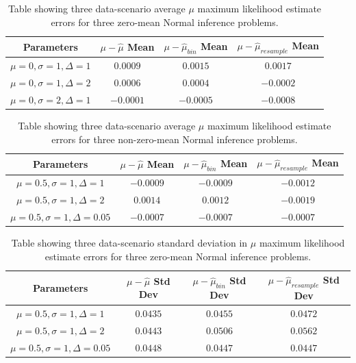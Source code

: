 \documentclass[11pt,a4,twosided,singlespacing,titlepagenumber=on,numbers=endperiod]{scrreprt}
\numberwithin{equation}{chapter} %
\theoremstyle{remark}
\begin{document}
\begin{table}[ht]
	\centering
	\begin{tabular}{|c|c|c|c|}
	\hline
		Parameters & $\mu - \hat{\mu}$ Mean & $\mu - \hat{\mu}_{bin}$ Mean & $\mu - \hat{\mu}_{resample}$ Mean  \\
	\hline
		$\mu=0, \sigma=1, \Delta=1$ & $0.0009$ & $0.0015$ & $0.0017$ \\
	\hline
		$\mu=0, \sigma=1, \Delta=2$ & $0.0006$ & $0.0004$ & $-0.0002$ \\
	\hline
		$\mu=0, \sigma=2, \Delta=1$ & $-0.0001$ & $-0.0005$ & $-0.0008$ \\
	\hline
	\end{tabular}
	\caption{Table showing three data-scenario average $\mu$ maximum likelihood estimate errors for three zero-mean Normal inference problems.}
	\label{tab:mu_hat_error}
\end{table}
\begin{table}[ht]
	\centering
	\begin{tabular}{|c|c|c|c|}
	\hline
		Parameters & $\mu - \hat{\mu}$ Mean & $\mu - \hat{\mu}_{bin}$ Mean & $\mu - \hat{\mu}_{resample}$ Mean  \\
	\hline
		$\mu=0.5, \sigma=1, \Delta=1$ & $-0.0009$ & $-0.0009$ & $-0.0012$ \\
	\hline
		$\mu=0.5, \sigma=1, \Delta=2$ & $0.0014$ & $0.0012$ & $-0.0019$ \\
	\hline
		$\mu=0.5, \sigma=1, \Delta=0.05$ & $-0.0007$ & $-0.0007$ & $-0.0007$ \\
	\hline
	\end{tabular}
	\caption{Table showing three data-scenario average $\mu$ maximum likelihood estimate errors for three non-zero-mean Normal inference problems.}
	\label{tab:mu_hat_error_offset}
\end{table}
\begin{table}[ht]
	\centering
	\begin{tabular}{|c|c|c|c|}
	\hline
	Parameters & $\mu - \hat{\mu}$ Std Dev & $\mu - \hat{\mu}_{bin}$ Std Dev & $\mu - \hat{\mu}_{resample}$ Std Dev \\
	\hline
		$\mu=0.5, \sigma=1, \Delta=1$ & $0.0435$ & $0.0455$ & $0.0472$ \\
	\hline
		$\mu=0.5, \sigma=1, \Delta=2$ & $0.0443$ & $0.0506$ & $0.0562$ \\
	\hline
		$\mu=0.5, \sigma=1, \Delta=0.05$ & $0.0448$ & $0.0447$ & $0.0447$ \\
	\hline
	\end{tabular}
	\caption{Table showing three data-scenario standard deviation in $\mu$ maximum likelihood estimate errors for three zero-mean Normal inference problems.}
	\label{tab:mu_hat_std_offset}
\end{table}
\endgroup
\end{document}
